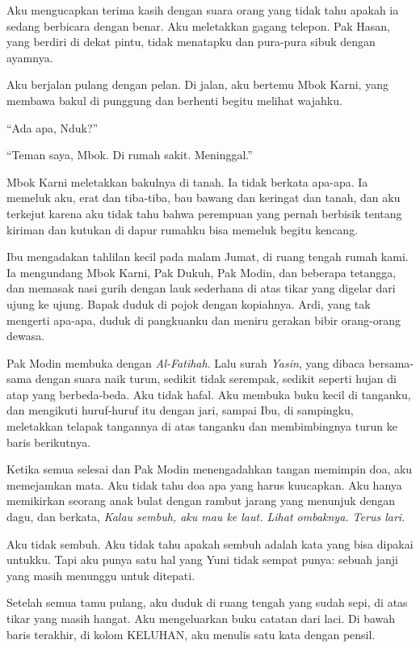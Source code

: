 \documentclass[11pt,twoside,openany]{book}
\makeatletter
\newcommand{\scenebreak}{\par\vspace{0.9em}{\centering\textsc{*\hspace{0.7em}*\hspace{0.7em}*}\par}\vspace{0.9em}\@afterindentfalse\@afterheading}
\makeatother
\begin{document}
Aku mengucapkan terima kasih dengan suara orang yang tidak tahu apakah ia sedang berbicara dengan benar. Aku meletakkan gagang telepon. Pak Hasan, yang berdiri di dekat pintu, tidak menatapku dan pura-pura sibuk dengan ayamnya.

Aku berjalan pulang dengan pelan. Di jalan, aku bertemu Mbok Karni, yang membawa bakul di punggung dan berhenti begitu melihat wajahku.

``Ada apa, Nduk?''

``Teman saya, Mbok. Di rumah sakit. Meninggal.''

Mbok Karni meletakkan bakulnya di tanah. Ia tidak berkata apa-apa. Ia memeluk aku, erat dan tiba-tiba, bau bawang dan keringat dan tanah, dan aku terkejut karena aku tidak tahu bahwa perempuan yang pernah berbisik tentang kiriman dan kutukan di dapur rumahku bisa memeluk begitu kencang.

\scenebreak
Ibu mengadakan tahlilan kecil pada malam Jumat, di ruang tengah rumah kami. Ia mengundang Mbok Karni, Pak Dukuh, Pak Modin, dan beberapa tetangga, dan memasak nasi gurih dengan lauk sederhana di atas tikar yang digelar dari ujung ke ujung. Bapak duduk di pojok dengan kopiahnya. Ardi, yang tak mengerti apa-apa, duduk di pangkuanku dan meniru gerakan bibir orang-orang dewasa.

Pak Modin membuka dengan \emph{Al-Fatihah}. Lalu surah \emph{Yasin}, yang dibaca bersama-sama dengan suara naik turun, sedikit tidak serempak, sedikit seperti hujan di atap yang berbeda-beda. Aku tidak hafal. Aku membuka buku kecil di tanganku, dan mengikuti huruf-huruf itu dengan jari, sampai Ibu, di sampingku, meletakkan telapak tangannya di atas tanganku dan membimbingnya turun ke baris berikutnya.

Ketika semua selesai dan Pak Modin menengadahkan tangan memimpin doa, aku memejamkan mata. Aku tidak tahu doa apa yang harus kuucapkan. Aku hanya memikirkan seorang anak bulat dengan rambut jarang yang menunjuk dengan dagu, dan berkata, \emph{Kalau sembuh, aku mau ke laut. Lihat ombaknya. Terus lari.}

Aku tidak sembuh. Aku tidak tahu apakah sembuh adalah kata yang bisa dipakai untukku. Tapi aku punya satu hal yang Yuni tidak sempat punya: sebuah janji yang masih menunggu untuk ditepati.

Setelah semua tamu pulang, aku duduk di ruang tengah yang sudah sepi, di atas tikar yang masih hangat. Aku mengeluarkan buku catatan dari laci. Di bawah baris terakhir, di kolom KELUHAN, aku menulis satu kata dengan pensil.
\end{document}
